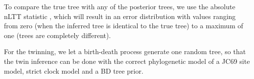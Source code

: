 To compare the true tree with any of the posterior trees,
we use the absolute nLTT statistic \citet{janzen2015},
which will result in an error distribution with values
ranging from zero (when the inferred tree is identical 
to the true tree) to a maximum of one (trees are completely different).

For the twinning, we let a birth-death process generate one random tree,
so that the twin inference can be done with the correct phylogenetic
model of a JC69 site model, strict clock model and a BD tree prior.
